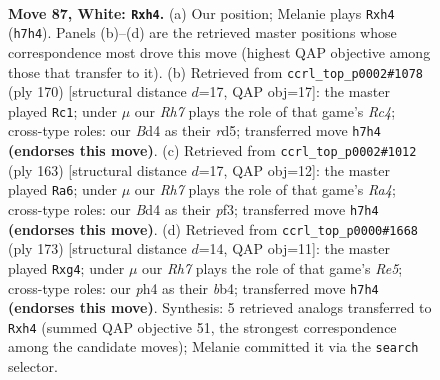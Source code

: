 \documentclass[11pt]{article}
\begin{document}
\clearpage

\begin{figure}[p]\centering
\begin{subfigure}{0.46\textwidth}\centering
\resizebox{\linewidth}{!}{%
\newchessgame
\chessboard[
  setfen={5k2/7R/r7/8/1K1Bp2p/5p1P/5P2/8 w - - 8 87},
  showmover=false,
  pgfstyle=straightmove, color=movearrow, markmove={h7-h4}
]}
\caption{}
\end{subfigure}\hfill
\begin{subfigure}{0.46\textwidth}\centering
\resizebox{\linewidth}{!}{%
\newchessgame
\chessboard[
  setfen={8/1k5K/8/3r3p/2R3pP/6P1/8/8 w - - 18 86},
  showmover=false,
  pgfstyle=straightmove, color=movearrow, markmove={c4-c1}
]}
\caption{}
\end{subfigure}
\\[4pt]
\begin{subfigure}{0.46\textwidth}\centering
\resizebox{\linewidth}{!}{%
\newchessgame
\chessboard[
  setfen={6k1/8/6p1/r5Pp/2RK3P/5P2/8/8 b - - 53 82},
  showmover=false,
  pgfstyle=straightmove, color=movearrow, markmove={a5-a6}
]}
\caption{}
\end{subfigure}\hfill
\begin{subfigure}{0.46\textwidth}\centering
\resizebox{\linewidth}{!}{%
\newchessgame
\chessboard[
  setfen={6k1/2R5/7p/6bP/1B2r1P1/1K6/8/8 b - - 2 87},
  showmover=false,
  pgfstyle=straightmove, color=movearrow, markmove={e4-g4}
]}
\caption{}
\end{subfigure}
\caption{\textbf{Move 87, White: \texttt{Rxh4}.} (a) Our position; Melanie plays \texttt{Rxh4} (\texttt{h7h4}). Panels (b)--(d) are the retrieved master positions whose correspondence most drove this move (highest QAP objective among those that transfer to it). (b) Retrieved from \texttt{ccrl\_top\_p0002\#1078} (ply 170) [structural distance $d$=17, QAP obj=17]: the master played \texttt{Rc1}; under $\mu$ our \emph{Rh7} plays the role of that game's \emph{Rc4}; cross-type roles: our \emph{B}d4 as their \emph{r}d5; transferred move \texttt{h7h4} \textbf{(endorses this move)}. (c) Retrieved from \texttt{ccrl\_top\_p0002\#1012} (ply 163) [structural distance $d$=17, QAP obj=12]: the master played \texttt{Ra6}; under $\mu$ our \emph{Rh7} plays the role of that game's \emph{Ra4}; cross-type roles: our \emph{B}d4 as their \emph{p}f3; transferred move \texttt{h7h4} \textbf{(endorses this move)}. (d) Retrieved from \texttt{ccrl\_top\_p0000\#1668} (ply 173) [structural distance $d$=14, QAP obj=11]: the master played \texttt{Rxg4}; under $\mu$ our \emph{Rh7} plays the role of that game's \emph{Re5}; cross-type roles: our \emph{p}h4 as their \emph{b}b4; transferred move \texttt{h7h4} \textbf{(endorses this move)}. Synthesis: 5 retrieved analogs transferred to \texttt{Rxh4} (summed QAP objective 51, the strongest correspondence among the candidate moves); Melanie committed it via the \texttt{search} selector.}
\label{fig:thought-m172}
\end{figure}
\end{document}
